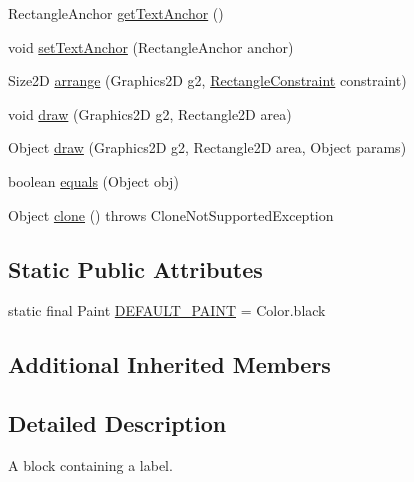 \begin{DoxyCompactItemize}
\item 
Rectangle\+Anchor \mbox{\hyperlink{classorg_1_1jfree_1_1chart_1_1block_1_1_label_block_a426432351700ca6d4dddfa1da2b3f9f4}{get\+Text\+Anchor}} ()
\item 
void \mbox{\hyperlink{classorg_1_1jfree_1_1chart_1_1block_1_1_label_block_a524c31c631e5cd29792725037c1ddfdf}{set\+Text\+Anchor}} (Rectangle\+Anchor anchor)
\item 
Size2D \mbox{\hyperlink{classorg_1_1jfree_1_1chart_1_1block_1_1_label_block_afdb9ca1eaacea8719e9ff9fa30f14e1a}{arrange}} (Graphics2D g2, \mbox{\hyperlink{classorg_1_1jfree_1_1chart_1_1block_1_1_rectangle_constraint}{Rectangle\+Constraint}} constraint)
\item 
void \mbox{\hyperlink{classorg_1_1jfree_1_1chart_1_1block_1_1_label_block_acbc6372fee69a3d3f6023606e9a738c8}{draw}} (Graphics2D g2, Rectangle2D area)
\item 
Object \mbox{\hyperlink{classorg_1_1jfree_1_1chart_1_1block_1_1_label_block_a37ce0083b41db3d2c02e4868476bffaa}{draw}} (Graphics2D g2, Rectangle2D area, Object params)
\item 
boolean \mbox{\hyperlink{classorg_1_1jfree_1_1chart_1_1block_1_1_label_block_aadd46ed488ac010e2c3ed686dd096a46}{equals}} (Object obj)
\item 
Object \mbox{\hyperlink{classorg_1_1jfree_1_1chart_1_1block_1_1_label_block_ada9be5a99202926ce7f9e3d033c98d2e}{clone}} ()  throws Clone\+Not\+Supported\+Exception 
\end{DoxyCompactItemize}
\subsection*{Static Public Attributes}
\begin{DoxyCompactItemize}
\item 
static final Paint \mbox{\hyperlink{classorg_1_1jfree_1_1chart_1_1block_1_1_label_block_a21c6a91d4806cb57de4864b7a6572572}{D\+E\+F\+A\+U\+L\+T\+\_\+\+P\+A\+I\+NT}} = Color.\+black
\end{DoxyCompactItemize}
\subsection*{Additional Inherited Members}


\subsection{Detailed Description}
A block containing a label. 

